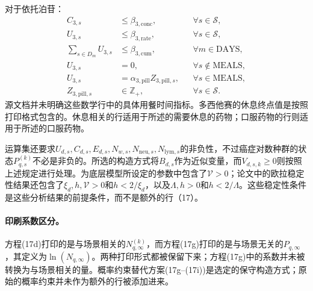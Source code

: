 \documentclass{article}
\begin{document}
对于依托泊苷：
\begin{align*}
C_{3,s}&\leq\beta_{3,\mathrm{conc}}, &&\forall s\in\mathcal S,\\
U_{3,s}&\leq\beta_{3,\mathrm{rate}}, &&\forall s\in\mathcal S,\\
\sum_{s\in D_m}U_{3,s}&\leq\beta_{3,\mathrm{cum}}, &&\forall m\in\mathrm{DAYS},\\
U_{3,s}&=0, &&\forall s\notin\mathrm{MEALS},\\
U_{3,s}&=\alpha_{3,\mathrm{pill}}Z_{3,\mathrm{pill},s}, &&\forall s\in\mathrm{MEALS},\\
Z_{3,\mathrm{pill},s}&\in\mathbb Z_+, &&\forall s\in\mathcal S.
\end{align*}
源文档并未明确这些数学行中的具体用餐时间指标。多西他赛的休息终点值是按照打印格式包含的。休息相关的行适用于所述的需要休息的药物；口服药物的行则适用于所述的口服药物。

运算集还要求$U_{d,s},C_{d,s},E_{d,s},N_{w,s},N_{\mathrm{neu},s},N_{\mathrm{lym},s}$的非负性，不过癌症对数种群的状态$P_{q,s}^{(k)}$不必是非负的。所选的构造方式将$B_{d,s}$作为近似变量，而$V_{d,s,k}\geq0$则按照上述规定进行处理。为底层模型所设定的参数中包含了$\mathcal V>0$；论文中的欧拉稳定性结果还包含了$\xi_d,h,\mathcal V>0$和$h<2/\xi_d$，以及$\Lambda,h>0$和$h<2/\Lambda$。这些稳定性条件是这些分析结果的前提条件，而不是额外的行（17）。

\paragraph{印刷系数区分。}
方程(17d)打印的是与场景相关的$N_{q,\infty}^{(k)}$，而方程(17g)打印的是与场景无关的$P_{q,\infty}$，其定义为$\ln(N_{q,\infty})$。两种打印形式都被保留下来；方程(17g)中的系数并未被转换为与场景相关的量。概率约束替代方案(17g–(17i))是选定的保守构造方式；原始的概率约束并未作为额外的行被添加进来。
\end{document}
